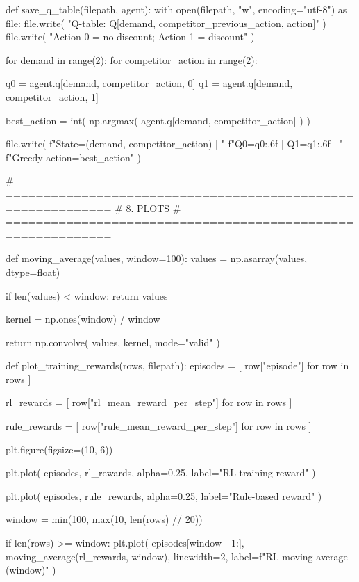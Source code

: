 def save_q_table(filepath, agent):
    with open(filepath, "w", encoding="utf-8") as file:
        file.write(
            "Q-table: Q[demand, competitor_previous_action, action]\n"
        )
        file.write(
            "Action 0 = no discount; Action 1 = discount\n\n"
        )

        for demand in range(2):
            for competitor_action in range(2):

                q0 = agent.q[demand, competitor_action, 0]
                q1 = agent.q[demand, competitor_action, 1]

                best_action = int(
                    np.argmax(
                        agent.q[demand, competitor_action]
                    )
                )

                file.write(
                    f"State=({demand}, {competitor_action}) | "
                    f"Q0={q0:.6f} | Q1={q1:.6f} | "
                    f"Greedy action={best_action}\n"
                )


# ============================================================
# 8. PLOTS
# ============================================================

def moving_average(values, window=100):
    values = np.asarray(values, dtype=float)

    if len(values) < window:
        return values

    kernel = np.ones(window) / window

    return np.convolve(
        values, kernel, mode="valid"
    )


def plot_training_rewards(rows, filepath):
    episodes = [
        row["episode"] for row in rows
    ]

    rl_rewards = [
        row["rl_mean_reward_per_step"] for row in rows
    ]

    rule_rewards = [
        row["rule_mean_reward_per_step"] for row in rows
    ]

    plt.figure(figsize=(10, 6))

    plt.plot(
        episodes, rl_rewards,
        alpha=0.25, label="RL training reward"
    )

    plt.plot(
        episodes, rule_rewards,
        alpha=0.25, label="Rule-based reward"
    )

    window = min(100, max(10, len(rows) // 20))

    if len(rows) >= window:
        plt.plot(
            episodes[window - 1:],
            moving_average(rl_rewards, window),
            linewidth=2,
            label=f"RL moving average ({window})"
        )

